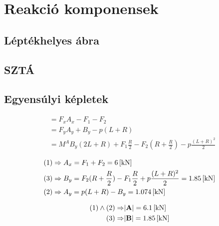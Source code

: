 \section{Reakció komponensek}

\subsection{Léptékhelyes ábra}
\subsection{SZTÁ}

\newpage

\subsection{Egyensúlyi képletek}

\begin{align}
	&\equal{F_x}{A_x - F_1 - F_2} \\
	&\equal{F_y}{A_y + B_y - p(L+R)} \\
	&\equal{M^A}
	{B_y(2L+R) + F_1 \frac{R}{2} - F_2 (R+\frac{R}{2}) - p\frac{(L+R)^2}{2}}
\end{align}

\begin{align}
	(1) &\Rightarrow A_x = F_1 + F_2 = \SI{6}{[\kilo\newton]} \\
	(3) &\Rightarrow B_y 
		= F_2 (R + \frac{R}{2}) - F_1\frac{R}{2} + p\frac{(L+R)^2}{2} 
		= \SI{1.85}{[\kilo\newton]} \\
	(2) &\Rightarrow A_y = p(L+R) - B_y = \SI{1.074}{[\kilo\newton]} \\
\end{align}

\begin{align}
	(1) \land (2) \Rightarrow &|\textbf{A}| = \SI{6.1}{[\kilo\newton]} \\
	(3) \Rightarrow &|\textbf{B}| = \SI{1.85}{[\kilo\newton]} 
\end{align}

